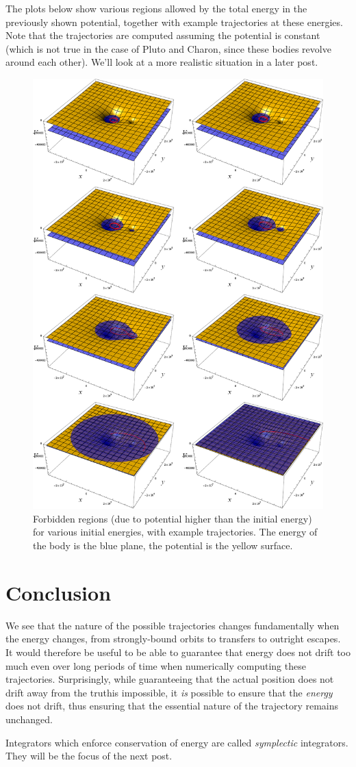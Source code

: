 \documentclass[10pt, a4paper, twoside]{basestyle}
\begin{document}
The plots below show various regions allowed by the total energy in the
previously shown potential, together with example trajectories at these
energies. Note that the trajectories are computed assuming the potential is
constant (which is not true in the case of Pluto and Charon, since these bodies
revolve around each other). We'll look at a more realistic situation in a later
post.
\begin{figure}
\includegraphics[scale=0.40]{rising-energy.png}
\caption{Forbidden regions (due to potential higher than the initial energy) for
various initial energies, with example trajectories. The energy of the body is
the blue plane, the potential is the yellow surface.}
\end{figure}

\section{Conclusion}
We see that the nature of the possible trajectories changes fundamentally when
the energy changes, from strongly-bound orbits to transfers to outright escapes.
It would therefore be useful to be able to guarantee that energy does not drift
too much even over long periods of time when numerically computing these
trajectories. Surprisingly, while guaranteeing that the actual position does not
drift away from the truthis impossible, it \emph{is} possible to ensure that the
\emph{energy} does not drift, thus ensuring that the essential nature of the
trajectory remains unchanged.

Integrators which enforce conservation of energy are called \emph{symplectic}
integrators. They will be the focus of the next post.
\end{document}
